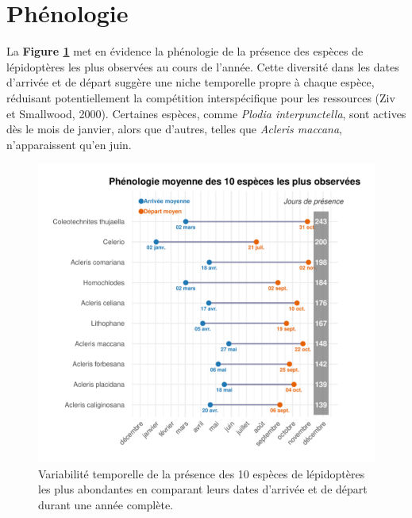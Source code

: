 \documentclass[9pt,twocolumn,twoside,]{pnas-new}
\begin{document}
\section*{Phénologie}\label{phuxe9nologie}

La \textbf{Figure \ref{fig:fig_phenologie}} met en évidence la
phénologie de la présence des espèces de lépidoptères les plus observées
au cours de l'année. Cette diversité dans les dates d'arrivée et de
départ suggère une niche temporelle propre à chaque espèce, réduisant
potentiellement la compétition interspécifique pour les ressources (Ziv
et Smallwood, 2000). Certaines espèces, comme \emph{Plodia
interpunctella}, sont actives dès le mois de janvier, alors que
d'autres, telles que \emph{Acleris maccana}, n'apparaissent qu'en juin.

\begin{figure}[H]

{\centering \includegraphics[width=0.8\linewidth]{rapport_final_BIO500_files/figure-latex/fig_phenologie-1} 

}

\caption{\label{fig:fig_phenologie}Variabilité temporelle de la présence des 10 espèces de lépidoptères les plus abondantes en comparant leurs dates d’arrivée et de départ durant une année complète.}\label{fig:fig_phenologie}
\end{figure}
\end{document}
